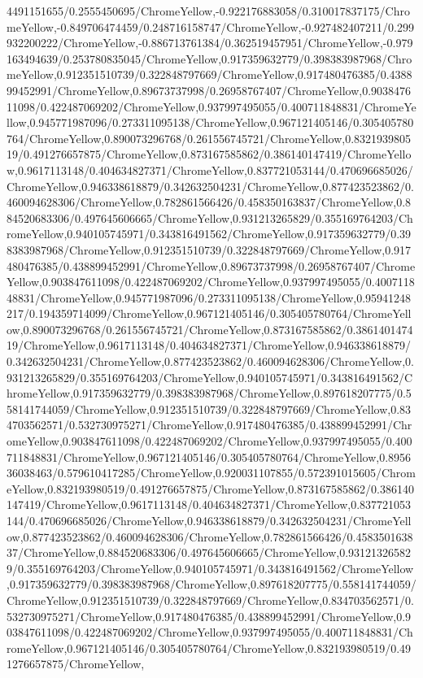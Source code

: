 {\begin{tikzternal}
{4491151655/0.2555450695/ChromeYellow,-0.922176883058/0.310017837175/ChromeYellow,-0.849706474459/0.248716158747/ChromeYellow,-0.927482407211/0.299932200222/ChromeYellow,-0.886713761384/0.362519457951/ChromeYellow,-0.979163494639/0.253780835045/ChromeYellow,0.917359632779/0.398383987968/ChromeYellow,0.912351510739/0.322848797669/ChromeYellow,0.917480476385/0.438899452991/ChromeYellow,0.89673737998/0.26958767407/ChromeYellow,0.903847611098/0.422487069202/ChromeYellow,0.937997495055/0.400711848831/ChromeYellow,0.945771987096/0.273311095138/ChromeYellow,0.967121405146/0.305405780764/ChromeYellow,0.890073296768/0.261556745721/ChromeYellow,0.832193980519/0.491276657875/ChromeYellow,0.873167585862/0.386140147419/ChromeYellow,0.9617113148/0.404634827371/ChromeYellow,0.837721053144/0.470696685026/ChromeYellow,0.946338618879/0.342632504231/ChromeYellow,0.877423523862/0.460094628306/ChromeYellow,0.782861566426/0.458350163837/ChromeYellow,0.884520683306/0.497645606665/ChromeYellow,0.931213265829/0.355169764203/ChromeYellow,0.940105745971/0.343816491562/ChromeYellow,0.917359632779/0.398383987968/ChromeYellow,0.912351510739/0.322848797669/ChromeYellow,0.917480476385/0.438899452991/ChromeYellow,0.89673737998/0.26958767407/ChromeYellow,0.903847611098/0.422487069202/ChromeYellow,0.937997495055/0.400711848831/ChromeYellow,0.945771987096/0.273311095138/ChromeYellow,0.95941248217/0.194359714099/ChromeYellow,0.967121405146/0.305405780764/ChromeYellow,0.890073296768/0.261556745721/ChromeYellow,0.873167585862/0.386140147419/ChromeYellow,0.9617113148/0.404634827371/ChromeYellow,0.946338618879/0.342632504231/ChromeYellow,0.877423523862/0.460094628306/ChromeYellow,0.931213265829/0.355169764203/ChromeYellow,0.940105745971/0.343816491562/ChromeYellow,0.917359632779/0.398383987968/ChromeYellow,0.897618207775/0.558141744059/ChromeYellow,0.912351510739/0.322848797669/ChromeYellow,0.834703562571/0.532730975271/ChromeYellow,0.917480476385/0.438899452991/ChromeYellow,0.903847611098/0.422487069202/ChromeYellow,0.937997495055/0.400711848831/ChromeYellow,0.967121405146/0.305405780764/ChromeYellow,0.895636038463/0.579610417285/ChromeYellow,0.920031107855/0.572391015605/ChromeYellow,0.832193980519/0.491276657875/ChromeYellow,0.873167585862/0.386140147419/ChromeYellow,0.9617113148/0.404634827371/ChromeYellow,0.837721053144/0.470696685026/ChromeYellow,0.946338618879/0.342632504231/ChromeYellow,0.877423523862/0.460094628306/ChromeYellow,0.782861566426/0.458350163837/ChromeYellow,0.884520683306/0.497645606665/ChromeYellow,0.931213265829/0.355169764203/ChromeYellow,0.940105745971/0.343816491562/ChromeYellow,0.917359632779/0.398383987968/ChromeYellow,0.897618207775/0.558141744059/ChromeYellow,0.912351510739/0.322848797669/ChromeYellow,0.834703562571/0.532730975271/ChromeYellow,0.917480476385/0.438899452991/ChromeYellow,0.903847611098/0.422487069202/ChromeYellow,0.937997495055/0.400711848831/ChromeYellow,0.967121405146/0.305405780764/ChromeYellow,0.832193980519/0.491276657875/ChromeYellow,
}
\end{tikzternal}}
